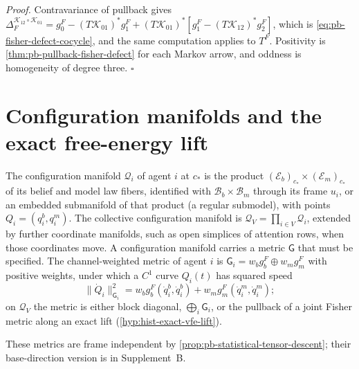 \noindent\emph{Proof.}
Contravariance of pullback gives
$\Delta_F^{\mathscr K_{12}\circ\mathscr K_{01}}
=g_0^F-(T\mathscr K_{01})^*g_1^F+(T\mathscr K_{01})^*[g_1^F-(T\mathscr K_{12})^*g_2^F]$,
which is \eqref{eq:pb-fisher-defect-cocycle}, and the same computation applies to $T^F$.
Positivity is \cref{thm:pb-pullback-fisher-defect} for each Markov arrow, and oddness is
homogeneity of degree three.  $\square$

\section{Configuration manifolds and the exact free-energy lift}
\label{sec:hist-vfe-orbit-selection}

The configuration manifold $\mathcal Q_i$ of agent $i$ at $c_*$ is the product
$(\mathcal E_b)_{c_*}\times(\mathcal E_m)_{c_*}$ of its belief and model law fibers,
identified with $\mathcal B_b\times\mathcal B_m$ through its frame $u_i$, or an embedded
submanifold of that product (a regular submodel), with points $Q_i=(q_i^b,q_i^m)$.  The
collective configuration manifold is $\mathcal Q_V=\prod_{i\in V}\mathcal Q_i$, extended
by further coordinate manifolds, such as open simplices of attention rows, when those
coordinates move.  A configuration manifold carries a metric $\mathsf G$ that must be
specified.  The channel-weighted metric of agent $i$ is
$\mathsf G_i=w_bg^F_b\oplus w_mg^F_m$ with positive weights, under which a $C^1$ curve
$Q_i(t)$ has squared speed
\begin{equation}
\lVert\dot Q_i\rVert_{\mathsf G_i}^2
=w_bg^F_b(\dot q_i^b,\dot q_i^b)+w_mg^F_m(\dot q_i^m,\dot q_i^m);
\label{eq:hist-pointwise-clock-speed}
\end{equation}
on $\mathcal Q_V$ the metric is either block diagonal, $\bigoplus_i\mathsf G_i$, or the
pullback of a joint Fisher metric along an exact lift (\cref{hyp:hist-exact-vfe-lift}).

These metrics are frame independent by \cref{prop:pb-statistical-tensor-descent}; their
base-direction version is in Supplement~B.

